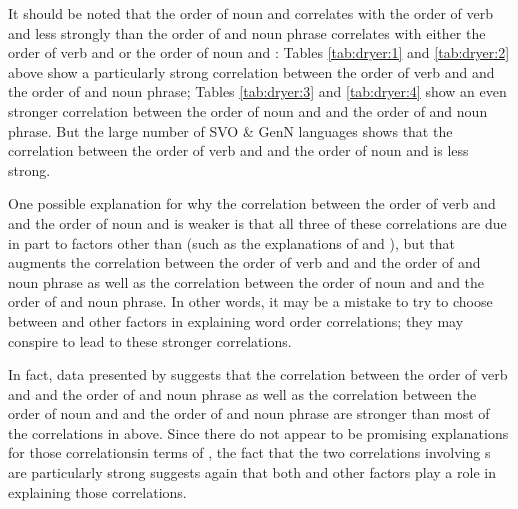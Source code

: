 \documentclass[output=paper]{langsci/langscibook}
\begin{document}
It should be noted that the order of noun and  correlates with the order of verb and  less strongly than the order of  and noun phrase correlates with either the order of verb and  or the order of noun and : Tables \ref{tab:dryer:1} and \ref{tab:dryer:2} above show a particularly strong correlation between the order of verb and  and the order of  and noun phrase; Tables \ref{tab:dryer:3} and \ref{tab:dryer:4} show an even stronger correlation between the order of noun and  and the order of  and noun phrase. But the large number of SVO \& GenN languages shows that the correlation between the order of verb and  and the order of noun and  is less strong.

One possible explanation for why the correlation between the order of verb and  and the order of noun and  is weaker is that all three of these correlations are due in part to factors other than  (such as the  explanations of \citealt{Dryer1992} and \citealt{Hawkins1994_Perf,Hawkins2004_Eff,Hawkins2014_VarEff}), but that  augments the correlation between the order of verb and  and the order of  and noun phrase as well as the correlation between the order of noun and  and the order of  and noun phrase. In other words, it may be a mistake to try to choose between  and other factors in explaining word order correlations; they may conspire to lead to these stronger correlations.

In fact, data presented by \citet{Dryer1992_Greenb,Dryer2013_Six2} suggests that the correlation between the order of verb and  and the order of  and noun phrase as well as the correlation between the order of noun and  and the order of  and noun phrase are stronger than most of the correlations in  above. Since there do not appear to be promising explanations for those correlationsin terms of , the fact that the two correlations involving s are particularly strong suggests again that both  and other factors play a role in explaining those correlations.
\end{document}
